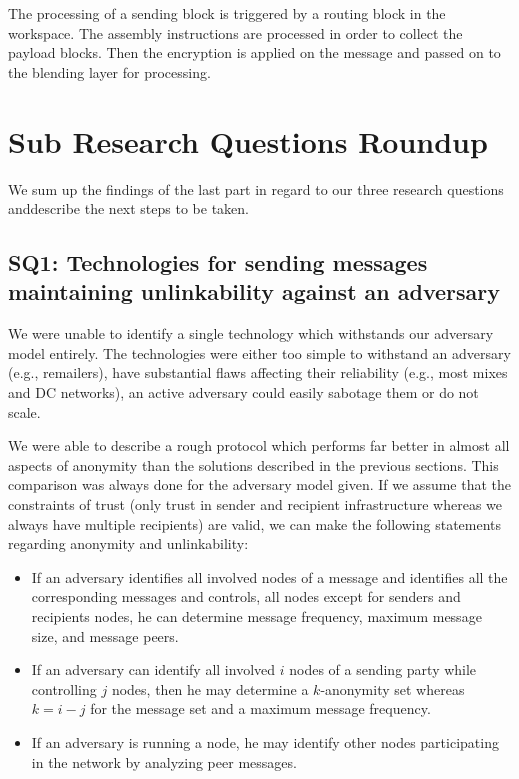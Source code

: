 The processing of a sending block is triggered by a routing block in the workspace. The assembly instructions are processed in order to collect the payload blocks. Then the encryption is applied on the message and passed on to the blending layer for processing.

\section{Sub Research Questions Roundup}
We sum up the findings of the last part in regard to our three research questions anddescribe the next steps to be taken.

\subsection{SQ1: Technologies for sending messages maintaining unlinkability against an adversary}
We were unable to identify a single technology which withstands our adversary model entirely. The technologies were either too simple to withstand an adversary (e.g., remailers), have substantial flaws affecting their reliability (e.g., most mixes and DC networks), an active adversary could easily sabotage them or do not scale.

We were able to describe a rough protocol which performs far better in almost all aspects of anonymity than the solutions described in the previous sections. This comparison was always done for the adversary model given. If we assume that the constraints of trust (only trust in sender and recipient infrastructure whereas we always have multiple recipients) are valid, we can make the following statements regarding anonymity and unlinkability:
\begin{itemize}
	\item If an adversary identifies all involved nodes of a message and identifies all the corresponding messages and controls, all nodes except for senders and recipients nodes, he can determine message frequency, maximum message size, and message peers.
	\item If an adversary can identify all involved $i$ nodes of a sending party while controlling $j$ nodes, then he may determine a $k$-anonymity set whereas $k=i-j$ for the message set and a maximum message frequency. 
	\item If an adversary is running a node, he may identify other nodes participating in the network by analyzing peer messages.
\end{itemize}

